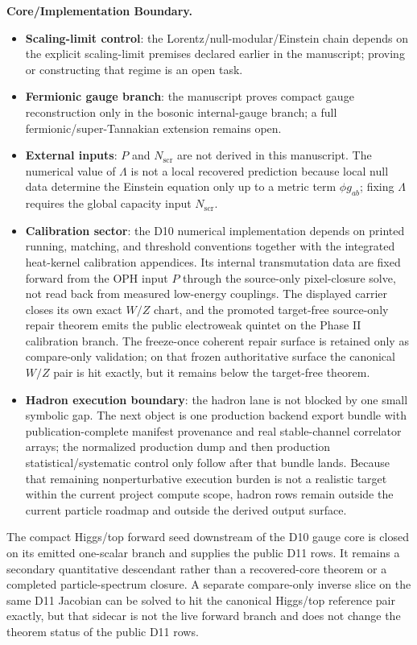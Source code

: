 \textbf{Core/Implementation Boundary.}
\begin{itemize}
\item \textbf{Scaling-limit control}: the Lorentz/null-modular/Einstein chain depends on the explicit scaling-limit premises declared earlier in the manuscript; proving or constructing that regime is an open task.
\item \textbf{Fermionic gauge branch}: the manuscript proves compact gauge reconstruction only in the bosonic internal-gauge branch; a full fermionic/super-Tannakian extension remains open.
\item \textbf{External inputs}: $P$ and $N_{\mathrm{scr}}$ are not derived in this manuscript. The numerical value of $\Lambda$ is not a local recovered prediction because local null data determine the Einstein equation only up to a metric term $\phi g_{ab}$; fixing $\Lambda$ requires the global capacity input $N_{\mathrm{scr}}$.
\item \textbf{Calibration sector}: the D10 numerical implementation depends on printed running, matching, and threshold conventions together with the integrated heat-kernel calibration appendices. Its internal transmutation data are fixed forward from the OPH input \(P\) through the source-only pixel-closure solve, not read back from measured low-energy couplings. The displayed carrier closes its own exact \(W/Z\) chart, and the promoted target-free source-only repair theorem emits the public electroweak quintet on the Phase II calibration branch. The freeze-once coherent repair surface is retained only as compare-only validation; on that frozen authoritative surface the canonical \(W/Z\) pair is hit exactly, but it remains below the target-free theorem.
\item \textbf{Hadron execution boundary}: the hadron lane is not blocked by one small symbolic gap. The next object is one production backend export bundle with publication-complete manifest provenance and real stable-channel correlator arrays; the normalized production dump and then production statistical/systematic control only follow after that bundle lands. Because that remaining nonperturbative execution burden is not a realistic target within the current project compute scope, hadron rows remain outside the current particle roadmap and outside the derived output surface.
\end{itemize}

The compact Higgs/top forward seed downstream of the D10 gauge core is closed on its emitted one-scalar branch and supplies the public D11 rows. It remains a secondary quantitative descendant rather than a recovered-core theorem or a completed particle-spectrum closure. A separate compare-only inverse slice on the same D11 Jacobian can be solved to hit the canonical Higgs/top reference pair exactly, but that sidecar is not the live forward branch and does not change the theorem status of the public D11 rows.


